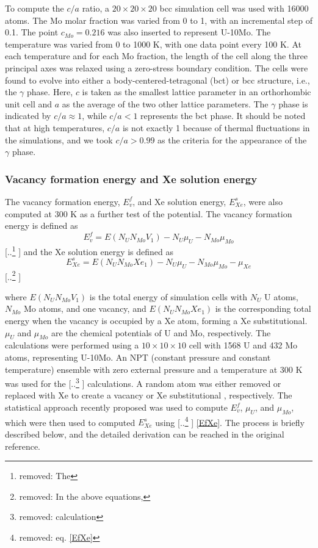 \documentclass[review]{elsarticle}
\providecommand{\DIFaddtex}[1]{{\protect\color{blue} \sf #1}} %
\providecommand{\DIFdeltex}[1]{{\protect\color{red} [..\footnote{removed: #1} ]}} %
\providecommand{\DIFaddbegin}{} %
\providecommand{\DIFaddend}{} %
\providecommand{\DIFdelbegin}{} %
\providecommand{\DIFdelend}{} %
\providecommand{\DIFadd}[1]{\texorpdfstring{\DIFaddtex{#1}}{#1}} %
\providecommand{\DIFdel}[1]{\texorpdfstring{\DIFdeltex{#1}}{}} %
\newcommand{\DIFscaledelfig}{0.5}
\newlength{\DIFdelgraphicswidth} %
\newlength{\DIFdelgraphicsheight} %
\newcommand{\DIFaddincludegraphics}[2][]{{\color{blue}\fbox{\DIFOincludegraphics[#1]{#2}}}} %
\newcommand{\DIFdelincludegraphics}[2][]{%
\sbox{\DIFdelgraphicsbox}{\DIFOincludegraphics[#1]{#2}}%
\settoboxwidth{\DIFdelgraphicswidth}{\DIFdelgraphicsbox} %
\settoboxtotalheight{\DIFdelgraphicsheight}{\DIFdelgraphicsbox} %
\scalebox{\DIFscaledelfig}{%
\parbox[b]{\DIFdelgraphicswidth}{\usebox{\DIFdelgraphicsbox}\\[-\baselineskip] \rule{\DIFdelgraphicswidth}{0em}}\llap{\resizebox{\DIFdelgraphicswidth}{\DIFdelgraphicsheight}{%
\setlength{\unitlength}{\DIFdelgraphicswidth}%
\begin{picture}(1,1)%
\thicklines\linethickness{2pt} %
{\color[rgb]{1,0,0}\put(0,0){\framebox(1,1){}}}%
{\color[rgb]{1,0,0}\put(0,0){\line( 1,1){1}}}%
{\color[rgb]{1,0,0}\put(0,1){\line(1,-1){1}}}%
\end{picture}%
}\hspace*{3pt}}} %
} %
\DeclareRobustCommand{\DIFaddbegin}{\DIFOaddbegin \let\includegraphics\DIFaddincludegraphics} %
\DeclareRobustCommand{\DIFaddend}{\DIFOaddend \let\includegraphics\DIFOincludegraphics} %
\DeclareRobustCommand{\DIFdelbegin}{\DIFOdelbegin \let\includegraphics\DIFdelincludegraphics} %
\DeclareRobustCommand{\DIFdelend}{\DIFOaddend \let\includegraphics\DIFOincludegraphics} %
\begin{document}
To compute the $c/a$ ratio, a $20\times20\times20$ bcc simulation cell was used with 16000 atoms. The Mo molar fraction was varied from 0 to 1, with an incremental step of 0.1. The point $c_{Mo}=0.216$ was also inserted to represent U-10Mo. The temperature was varied from 0 to 1000 K, with one data point every 100 K. At each temperature and for each Mo fraction, the length of the cell along the three principal axes was relaxed using a zero-stress boundary condition. The cells were found to evolve into either a body-centered-tetragonal (bct) or bcc structure, i.e., the $\gamma$ phase. Here, $c$ is taken as the smallest lattice parameter in an orthorhombic unit cell and $a$ as the average of the two other lattice parameters. The $\gamma$ phase is indicated by $c/a{\approx}1$, while $c/a<1$ represents the bct phase. It should be noted that at high temperatures, $c/a$ is not exactly 1 because of thermal fluctuations in the simulations, and we took $c/a>0.99$ as the criteria for the appearance of the $\gamma$ phase. 

\subsubsection{Vacancy formation energy and Xe solution energy}
\DIFaddbegin 

\DIFaddend The vacancy formation energy, $E^f_v$, and Xe solution energy, $E^s_{Xe}$, were also computed at 300 K as a further test of the potential. The vacancy formation energy is defined as
\begin{equation}\label{Efv}
E^f_v = E(N_U N_{Mo} V_1) - N_U \mu_U - N_{Mo} \mu_{Mo} 
\end{equation}
\DIFdelbegin \DIFdel{The }\DIFdelend \DIFaddbegin \DIFadd{and the }\DIFaddend Xe solution energy is defined as 
 \begin{equation}\label{EfXe}
E^s_{Xe} = E(N_UN_{Mo}Xe_1)-N_U\mu_U-N_{Mo}\mu_{Mo}-\mu_{Xe} 
\end{equation}
\DIFdelbegin \DIFdel{In the above equations, }\DIFdelend \DIFaddbegin 

\noindent \DIFadd{where }\DIFaddend $E(N_UN_{Mo}V_1)$ is the total energy of simulation cells with $N_U$ U atoms, $N_{Mo}$ Mo atoms, and one vacancy, and $E(N_UN_{Mo}Xe_1)$ is the corresponding total energy when the vacancy is occupied by a Xe atom, forming a Xe substitutional. $\mu_U$ and $\mu_{Mo}$ are the chemical potentials of U and Mo, respectively. The calculations were performed using a $10\times10\times10$ cell with 1568 U and 432 Mo atoms, representing U-10Mo. An NPT (constant pressure and constant temperature) ensemble with zero external pressure and a temperature at 300 K was used for the \DIFdelbegin \DIFdel{calculation}\DIFdelend \DIFaddbegin \DIFadd{calculations}\DIFaddend . A random atom was either removed or replaced with Xe to create a vacancy or Xe substitutional\DIFaddbegin \DIFadd{, respectively}\DIFaddend . The statistical approach recently proposed \cite{zhang2021} was used to compute $E_v^f$, $\mu_U$, and $\mu_{Mo}$, which were then used to computed $E^s_{Xe}$ using \DIFdelbegin \DIFdel{eq. \ref{EfXe}}\DIFdelend \DIFaddbegin \DIFadd{\cref{EfXe}. The process is briefly described below, and the detailed derivation can be reached in the original reference}\DIFaddend . 
\end{document}
